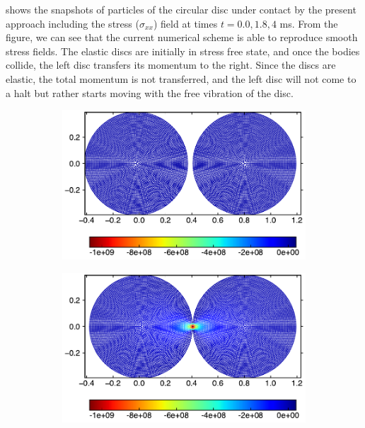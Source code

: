  shows the snapshots of
particles of the circular disc under contact by the present approach including
the stress ($\sigma_{xx}$) field at times $t=0.0, 1.8, 4$ ms. From the figure,
we can see that the current numerical scheme is able to reproduce smooth
stress fields. The elastic discs are initially in stress free state, and once
the bodies collide, the left disc transfers its momentum to the right. Since
the discs are elastic, the total momentum is not transferred, and the left
disc will not come to a halt but rather starts moving with the free vibration
of the disc.
\begin{figure}[!htpb]
  \centering
  \begin{subfigure}{0.48\textwidth}
    \centering
    \includegraphics[width=1.0\textwidth]{figures/csph/figures/yan_2021_curved_interface/collision_ctvf/time0}
    \label{fig:rings:ipst-nu-0.47-0}
  \end{subfigure}
  \begin{subfigure}{0.48\textwidth}
    \centering
    \includegraphics[width=1.0\textwidth]{figures/csph/figures/yan_2021_curved_interface/collision_ctvf/time1}
    \label{fig:rings:ipst-nu-0.47-1}
  \end{subfigure}


\end{figure}
